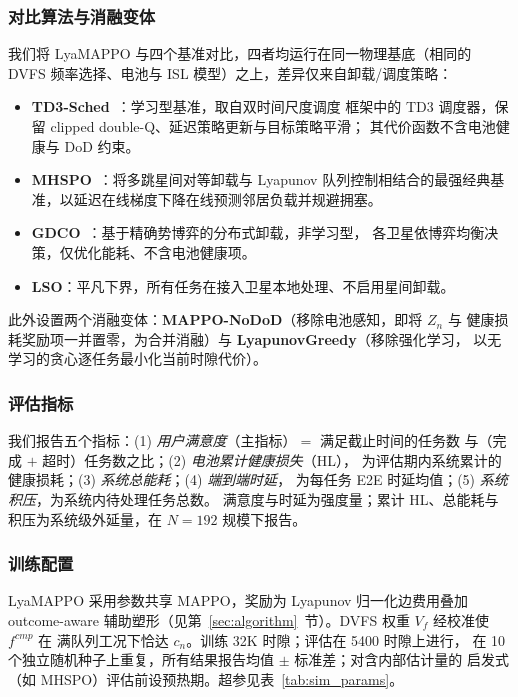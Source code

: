 \documentclass[a4paper,11pt]{article}
\begin{document}
\subsubsection{对比算法与消融变体}
我们将 LyaMAPPO 与四个基准对比，四者均运行在同一物理基底（相同的
DVFS 频率选择、电池与 ISL 模型）之上，差异仅来自卸载/调度策略：
\begin{itemize}
    \item \textbf{TD3-Sched}~\cite{huang2024td3}：学习型基准，取自双时间尺度调度
    框架中的 TD3 调度器，保留 clipped double-Q、延迟策略更新与目标策略平滑；
    其代价函数不含电池健康与 DoD 约束。
    \item \textbf{MHSPO}~\cite{zhang2024mhspo}：将多跳星间对等卸载与 Lyapunov
    队列控制相结合的最强经典基准，以延迟在线梯度下降在线预测邻居负载并规避拥塞。
    \item \textbf{GDCO}~\cite{6}：基于精确势博弈的分布式卸载，非学习型，
    各卫星依博弈均衡决策，仅优化能耗、不含电池健康项。
    \item \textbf{LSO}：平凡下界，所有任务在接入卫星本地处理、不启用星间卸载。
\end{itemize}
此外设置两个消融变体：\textbf{MAPPO-NoDoD}（移除电池感知，即将 $Z_n$ 与
健康损耗奖励项一并置零，为合并消融）与 \textbf{LyapunovGreedy}（移除强化学习，
以无学习的贪心逐任务最小化当前时隙代价）。

\subsubsection{评估指标}
我们报告五个指标：(1) \emph{用户满意度}（主指标）$=$ 满足截止时间的任务数
与（完成 $+$ 超时）任务数之比；(2) \emph{电池累计健康损失}（HL），
为评估期内系统累计的健康损耗；(3) \emph{系统总能耗}；(4) \emph{端到端时延}，
为每任务 E2E 时延均值；(5) \emph{系统积压}，为系统内待处理任务总数。
满意度与时延为强度量；累计 HL、总能耗与积压为系统级外延量，在 $N=192$ 规模下报告。

\subsubsection{训练配置}
LyaMAPPO 采用参数共享 MAPPO，奖励为 Lyapunov 归一化边费用叠加 outcome-aware
辅助塑形（见第~\ref{sec:algorithm}~节）。DVFS 权重 $V_f$ 经校准使 $f^{cmp}$ 在
满队列工况下恰达 $c_n$。训练 32K 时隙；评估在 5400 时隙上进行，
在 10 个独立随机种子上重复，所有结果报告均值 $\pm$ 标准差；对含内部估计量的
启发式（如 MHSPO）评估前设预热期。超参见表~\ref{tab:sim_params}。
\end{document}

